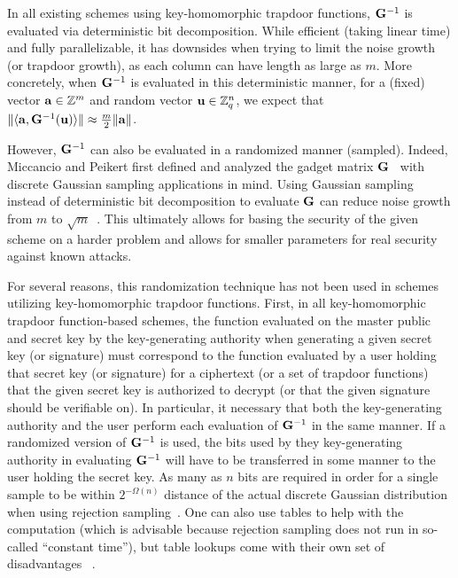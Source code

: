 In all existing schemes using key-homomorphic trapdoor functions,
$\mathbf{G}^{-1}$ is evaluated via deterministic bit decomposition. While
efficient (taking linear time) and fully parallelizable, it has
downsides when trying to limit the noise growth (or trapdoor growth), as each
column can have length as large as $m$. More concretely, when $\mathbf{G}^{-1}$ is
evaluated in this deterministic manner, for a (fixed) vector
$\mathbf{a} \in \mathbb{Z}^m$ and random vector $\mathbf{u} \in \mathbb{Z}_q^n$, we expect that 
$\lVert\langle\mathbf{a},\mathbf{G}^{-1}(\mathbf{u})\rangle\rVert\approx \tfrac{m}{2}\lVert\mathbf{a}\rVert$. 

However, $\mathbf{G}^{-1}$ can also be evaluated in a randomized manner
(sampled).  Indeed, Miccancio and Peikert first defined and analyzed
the gadget matrix $\mathbf{G}$~\cite{DBLP:conf/eurocrypt/MicciancioP12}
with discrete Gaussian sampling applications in mind. Using Gaussian sampling instead of
deterministic bit decomposition to evaluate $\mathbf{G}$ can reduce noise growth from $m$ to
$\sqrt{m}$~\cite{DBLP:conf/crypto/Alperin-SheriffP14}. This ultimately
allows for basing the security of the given scheme on a harder problem
and allows for smaller parameters for real security against known
attacks.

For several reasons, this randomization technique has not been used in
schemes utilizing key-homomorphic trapdoor functions.  First, in all
key-homomorphic trapdoor function-based schemes, the function
evaluated on the master public and secret key by the key-generating
authority when generating a given secret key (or signature) must
correspond to the function evaluated by a user holding that secret key
(or signature) for a ciphertext (or a set of trapdoor functions) that
the given secret key is authorized to decrypt (or that the given
signature should be verifiable on).  In particular, it necessary that
both the key-generating authority and the user perform each evaluation
of $\mathbf{G}^{-1}$ in the same manner. If a randomized version of
$\mathbf{G}^{-1}$ is used, the bits used by they key-generating authority
in evaluating $\mathbf{G}^{-1}$ will have to be transferred in some manner
to the user holding the secret key. As many as $n$ bits are required
in order for a single sample to be within $2^{-\Omega(n)}$ distance of
the actual discrete Gaussian distribution when using rejection
sampling~\cite{DBLP:conf/stoc/GentryPV08}. One can also use tables to
help with the computation (which is advisable because rejection
sampling does not run in so-called ``constant time''), but table
lookups come with their own set of disadvantages
~\cite{DBLP:journals/aaecc/DwarakanathG14}.


